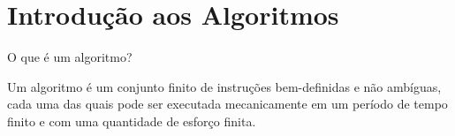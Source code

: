 \section{Introdução aos Algoritmos}

\begin{frame}{O que é um algoritmo?}

Um algoritmo é um conjunto finito de instruções bem-definidas e não ambíguas,
cada uma das quais pode ser executada mecanicamente em um período de tempo
finito e com uma quantidade de esforço finita.

\end{frame}
